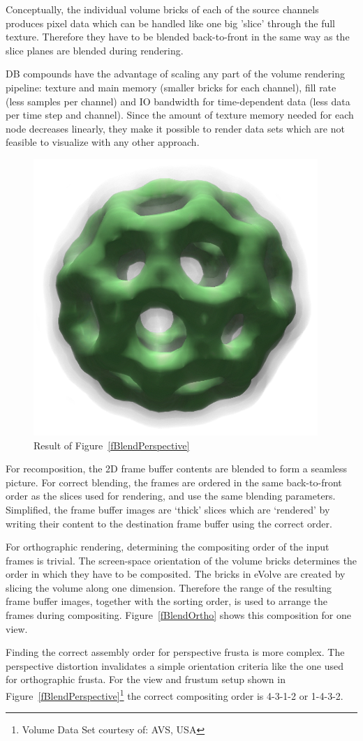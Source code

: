 \documentclass[10pt,a4]{scrartcl}
\newcommand{\fig}[1]{Figure~\ref{#1}}
\begin{document}
Conceptually, the individual volume bricks of each of the source
channels produces pixel data which can be handled like one big 'slice'
through the full texture. Therefore they have to be blen\-ded
back-to-front in the same way as the slice planes are blended during
rendering.

DB compounds have the advantage of scaling any part of the volume
rendering pipeline: texture and main memory (smaller bricks for each
channel), fill rate (less samples per channel) and IO bandwidth for
time-dependent data (less data per time step and channel). Since the
amount of texture memory needed for each node decreases linearly, they
make it possible to render data sets which are not feasible to
visualize with any other approach.

\begin{figure}
  \includegraphics[width=.382\textwidth]{images/volResult.png}
  {\caption{\label{fVolResult}Result of \fig{fBlendPerspective}}}
\end{figure}
For recomposition, the 2D frame buffer contents are blended to form a
seamless picture. For correct blending, the frames are ordered in the
same back-to-front order as the slices used for rendering, and use the
same blending parameters. Simplified, the frame buffer images are
`thick' slices which are `rendered' by writing their content to the
destination frame buffer using the correct order.

For orthographic rendering, determining the compositing order of the
input frames is trivial. The screen-space orientation of the volume
bricks determines the order in which they have to be composited. The
bricks in \textsf{eVolve} are created by slicing the volume along one
dimension. Therefore the range of the resulting frame buffer images,
together with the sorting order, is used to arrange the frames during
compositing. \fig{fBlendOrtho} shows this composition for one view.

Finding the correct assembly order for perspective frusta is more
complex. The perspective distortion invalidates a simple orientation
criteria like the one used for orthographic frusta. For the view and
frustum setup shown in \fig{fBlendPerspective}\footnote{Volume Data Set
  courtesy of: AVS, USA} the correct compositing order is 4-3-1-2 or
1-4-3-2.
\end{document}
